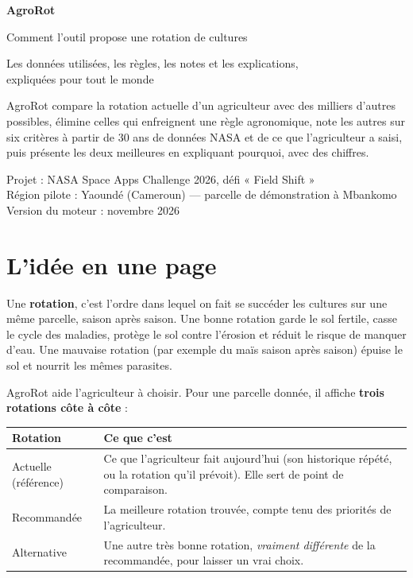 \documentclass[11pt,a4paper]{article}
\begin{document}
\begin{titlepage}
\vspace*{2.5cm}
{\color{vert}\Huge\bfseries AgroRot}\par\vspace{6pt}
{\LARGE Comment l'outil propose une rotation de cultures}\par\vspace{14pt}
{\large Les données utilisées, les règles, les notes et les explications,\\ expliquées pour tout le monde}\par
\vspace{1.5cm}
\begin{idee}
AgroRot compare la rotation actuelle d'un agriculteur avec des milliers d'autres possibles, élimine celles qui
enfreignent une règle agronomique, note les autres sur six critères à partir de 30 ans de données NASA et de ce
que l'agriculteur a saisi, puis présente les deux meilleures en expliquant pourquoi, avec des chiffres.
\end{idee}
\vfill
{\color{gris}
Projet : NASA Space Apps Challenge 2026, défi « Field Shift »\\
Région pilote : Yaoundé (Cameroun) — parcelle de démonstration à Mbankomo\\
Version du moteur : novembre 2026}
\end{titlepage}

\tableofcontents
\newpage

\section{L'idée en une page}

Une \textbf{rotation}, c'est l'ordre dans lequel on fait se succéder les cultures sur une même parcelle, saison
après saison. Une bonne rotation garde le sol fertile, casse le cycle des maladies, protège le sol contre
l'érosion et réduit le risque de manquer d'eau. Une mauvaise rotation (par exemple du maïs saison après saison)
épuise le sol et nourrit les mêmes parasites.

AgroRot aide l'agriculteur à choisir. Pour une parcelle donnée, il affiche \textbf{trois rotations côte à côte} :

\begin{center}
\begin{tabularx}{0.95\textwidth}{L{3.3cm}Y}
\toprule
\textbf{Rotation} & \textbf{Ce que c'est} \\
\midrule
Actuelle (référence) & Ce que l'agriculteur fait aujourd'hui (son historique répété, ou la rotation qu'il prévoit). Elle sert de point de comparaison. \\
Recommandée & La meilleure rotation trouvée, compte tenu des priorités de l'agriculteur. \\
Alternative & Une autre très bonne rotation, \emph{vraiment différente} de la recommandée, pour laisser un vrai choix. \\
\bottomrule
\end{tabularx}
\end{center}
\end{document}
